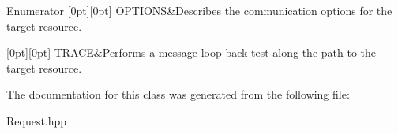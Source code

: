 \begin{DoxyEnumFields}{Enumerator}
[0pt][0pt]{}\mbox{\label{classHttp_1_1Request_acb00e56805e8f946c7240b898d823c4da164dd62adb30ca051b5289672a572f9b}} 
O\+P\+T\+I\+O\+NS&Describes the communication options for the target resource. \\
\hline

[0pt][0pt]{}\mbox{\label{classHttp_1_1Request_acb00e56805e8f946c7240b898d823c4da2d3e4144aa384b18849ab9a8abad74d6}} 
T\+R\+A\+CE&Performs a message loop-\/back test along the path to the target resource. \\
\hline

\end{DoxyEnumFields}


The documentation for this class was generated from the following file\+:\begin{DoxyCompactItemize}
\item 
Request.\+hpp\end{DoxyCompactItemize}
